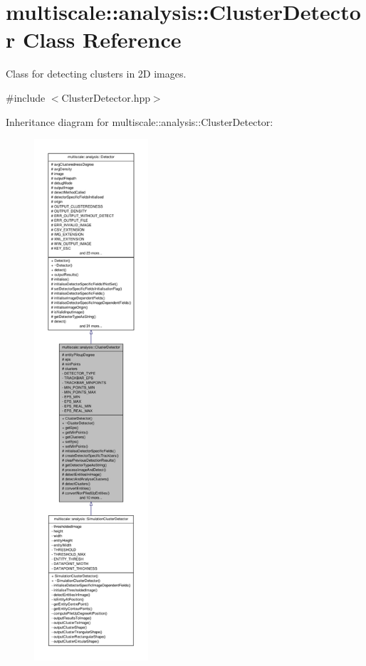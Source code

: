 \hypertarget{classmultiscale_1_1analysis_1_1ClusterDetector}{\section{multiscale\-:\-:analysis\-:\-:\-Cluster\-Detector \-Class \-Reference}
\label{classmultiscale_1_1analysis_1_1ClusterDetector}
}


\-Class for detecting clusters in 2\-D images.  




{\ttfamily \#include $<$\-Cluster\-Detector.\-hpp$>$}



\-Inheritance diagram for multiscale\-:\-:analysis\-:\-:\-Cluster\-Detector\-:
\nopagebreak
\begin{figure}[H]
\begin{center}
\leavevmode
\includegraphics[height=550pt]{classmultiscale_1_1analysis_1_1ClusterDetector__inherit__graph}
\end{center}
\end{figure}


